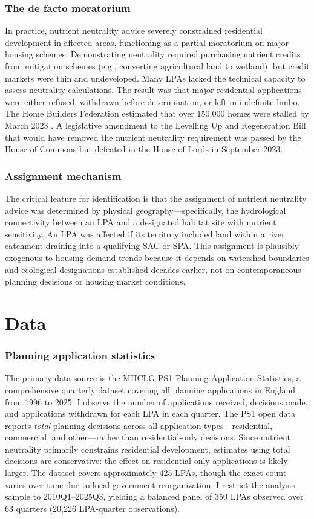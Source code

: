 \documentclass[12pt]{article}
\begin{document}
\subsubsection*{The de facto moratorium} In practice, nutrient neutrality advice severely constrained residential development in affected areas, functioning as a partial moratorium on major housing schemes. Demonstrating neutrality required purchasing nutrient credits from mitigation schemes (e.g., converting agricultural land to wetland), but credit markets were thin and undeveloped. Many LPAs lacked the technical capacity to assess neutrality calculations. The result was that major residential applications were either refused, withdrawn before determination, or left in indefinite limbo. The Home Builders Federation estimated that over 150,000 homes were stalled by March 2023 \citep{HBF2023}. A legislative amendment to the Levelling Up and Regeneration Bill that would have removed the nutrient neutrality requirement was passed by the House of Commons but defeated in the House of Lords in September 2023.

\subsubsection*{Assignment mechanism} The critical feature for identification is that the assignment of nutrient neutrality advice was determined by physical geography---specifically, the hydrological connectivity between an LPA and a designated habitat site with nutrient sensitivity. An LPA was affected if its territory included land within a river catchment draining into a qualifying SAC or SPA. This assignment is plausibly exogenous to housing demand trends because it depends on watershed boundaries and ecological designations established decades earlier, not on contemporaneous planning decisions or housing market conditions.

\section{Data}
\label{sec:data}

\subsubsection*{Planning application statistics} The primary data source is the MHCLG PS1 Planning Application Statistics, a comprehensive quarterly dataset covering all planning applications in England from 1996 to 2025. I observe the number of applications received, decisions made, and applications withdrawn for each LPA in each quarter. The PS1 open data reports \textit{total} planning decisions across all application types---residential, commercial, and other---rather than residential-only decisions. Since nutrient neutrality primarily constrains residential development, estimates using total decisions are conservative: the effect on residential-only applications is likely larger. The dataset covers approximately 425 LPAs, though the exact count varies over time due to local government reorganization. I restrict the analysis sample to 2010Q1--2025Q3, yielding a balanced panel of 350 LPAs observed over 63 quarters (20,226 LPA-quarter observations).
\end{document}
